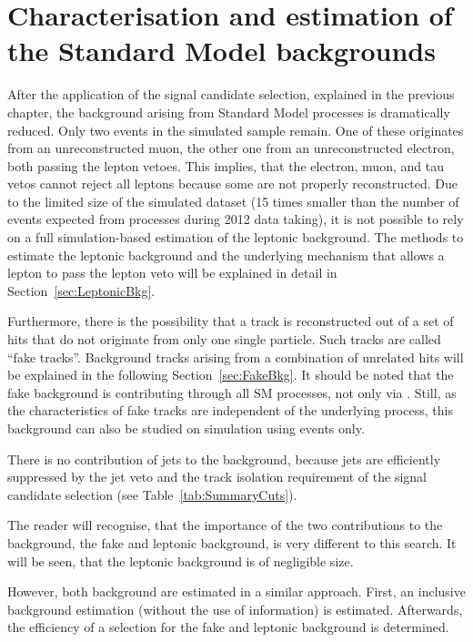 \FloatBarrier
\chapter{Characterisation and estimation of the Standard Model backgrounds}
\label{ch:BackgroundEstimation}
After the application of the signal candidate selection, explained in the previous chapter, the background arising from Standard Model processes is dramatically reduced.
Only two events in the simulated \WJets sample remain.
One of these originates from an unreconstructed muon, the other one from an unreconstructed electron, both passing the lepton vetoes.
This implies, that the electron, muon, and tau vetos cannot reject all leptons because some are not properly reconstructed.
Due to the limited size of the simulated \WJets dataset (15 times smaller than the number of events expected from \WJets processes during 2012 data taking), 
it is not possible to rely on a full simulation-based estimation of the leptonic background.
The methods to estimate the leptonic background and the underlying mechanism that allows a lepton to pass the lepton veto will be explained in detail in Section~\ref{sec:LeptonicBkg}.

Furthermore, there is the possibility that a track is reconstructed out of a set of hits that do not originate from only one single particle.
Such tracks are called ``fake tracks''. 
Background tracks arising from a combination of unrelated hits will be explained in the following Section~\ref{sec:FakeBkg}.
It should be noted that the fake background is contributing through all SM processes, not only via \WJets.
Still, as the characteristics of fake tracks are independent of the underlying process, this background can also be studied on simulation using \WJets events only.

There is no contribution of jets to the background, because jets are efficiently suppressed by the jet veto and the track isolation requirement of the signal candidate selection (see Table~\ref{tab:SummaryCuts}).

The reader will recognise, that the importance of the two contributions to the background, the fake and leptonic background, is very different to this search.
It will be seen, that the leptonic background is of negligible size.

However, both background are estimated in a similar approach.
First, an inclusive background estimation (without the use of \dedx information) is estimated.
Afterwards, the efficiency of a \dedx selection for the fake and leptonic background is determined.

